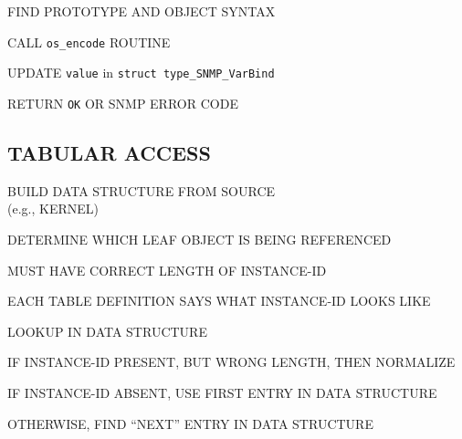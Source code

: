 \begin{bwslide}

\begin{nrtc}
\item	FIND PROTOTYPE AND OBJECT SYNTAX

\item	CALL \verb"os_encode" ROUTINE

\item	UPDATE \verb"value" in \verb"struct type_SNMP_VarBind"

\item	RETURN \verb"OK" OR SNMP ERROR CODE
\end{nrtc}
\end{bwslide}


\begin{bwslide}
\part*	{TABULAR ACCESS}\bf

\begin{nrtc}
\item	BUILD DATA STRUCTURE FROM SOURCE\\ (e.g., KERNEL)

\item	DETERMINE WHICH LEAF OBJECT IS BEING REFERENCED
\end{nrtc}
\end{bwslide}




\begin{bwslide}

\begin{nrtc}
\item	MUST HAVE CORRECT LENGTH OF INSTANCE-ID
    \begin{nrtc}
    \item	EACH TABLE DEFINITION SAYS WHAT INSTANCE-ID LOOKS LIKE
    \end{nrtc}

\item	LOOKUP IN DATA STRUCTURE
\end{nrtc}
\end{bwslide}


\begin{bwslide}

\begin{nrtc}
\item	IF INSTANCE-ID PRESENT, BUT WRONG LENGTH, THEN NORMALIZE

\item	IF INSTANCE-ID ABSENT, USE FIRST ENTRY IN DATA STRUCTURE

\item	OTHERWISE, FIND ``NEXT'' ENTRY IN DATA STRUCTURE
\end{nrtc}
\end{bwslide}


